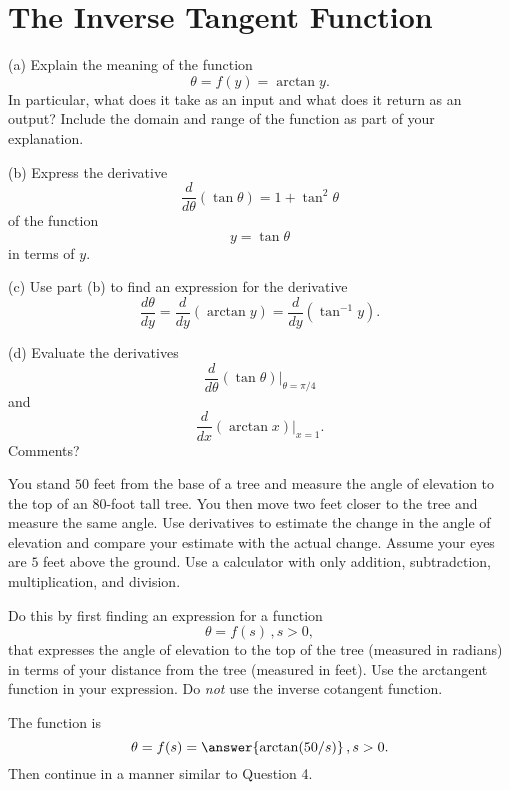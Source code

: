 \documentclass{ximera}
\begin{document}
\section*{The Inverse Tangent Function}
\begin{question}  \label{Q:KKDbret434}
(a) Explain the meaning of the function
\[
        \theta = f(y) = \arctan y .
\]
In particular, what does it take as an input and what does it return as an output? Include the domain and range of the function as part of your explanation.

(b) Express the derivative
\[
     \frac{d}{d\theta} \left( \tan\theta  \right) = 1 + \tan^2\theta
\]
of the function 
\[
    y = \tan\theta
\]
in terms of $y$.

(c) Use part (b) to find an expression for the derivative
\[
   \frac{d\theta}{dy} = \frac{d}{dy} \left(  \arctan y \right) =  \frac{d}{dy} \left(  \tan^{-1} y \right) .
\]

(d) Evaluate the derivatives
\[
   \frac{d}{d\theta} \left( \tan\theta  \right)\Big|_{\theta = \pi/4}
\]
and
\[
  \frac{d}{dx} \left(  \arctan x \right)\Big|_{x=1} . 
\]
Comments?
\end{question}

\begin{question}  \label{Q45544fhL}
You stand $50$ feet from the base of a tree and measure the angle of elevation to the top of an $80$-foot tall tree. You then move two feet closer to the tree and measure the same angle. Use derivatives to estimate the change in the angle of elevation and compare your estimate with the actual change. Assume your eyes are $5$ feet above the ground. Use a calculator with only addition, subtradction, multiplication, and division.

Do this by first finding an expression for a function
\[
    \theta = f(s) \, , s>0 ,
\]
that expresses the angle of elevation to the top of the tree (measured in radians) in terms of your distance from the tree (measured in feet). Use the arctangent function in your expression. Do \emph{not} use the inverse cotangent function.

The function is 
\[
      \theta = f(s)  = \answer{\arctan(50/s)} \, , s>0 .
\]
Then continue in a manner similar to Question 4.

\end{question}
\end{document}
